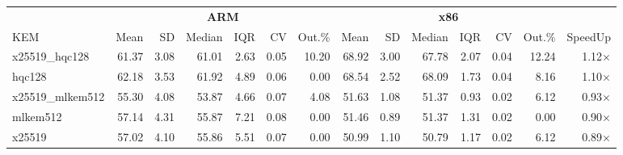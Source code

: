 \begin{table}[!ht]
\centering
\begin{tabular}{l|rrrrrr|rrrrrr|r}
\toprule
& \multicolumn{6}{c}{\bfseries ARM} & \multicolumn{6}{c}{\bfseries x86} & \\
\cmidrule(lr){2-7} \cmidrule(lr){8-13}
KEM & Mean & SD & Median & IQR & CV & Out.\% & Mean & SD & Median & IQR & CV & Out.\% & SpeedUp \\
\midrule
x25519_hqc128 & 61.37 & 3.08 & 61.01 & 2.63 & 0.05 & 10.20 & 68.92 & 3.00 & 67.78 & 2.07 & 0.04 & 12.24 & 1.12× \\
hqc128 & 62.18 & 3.53 & 61.92 & 4.89 & 0.06 & 0.00 & 68.54 & 2.52 & 68.09 & 1.73 & 0.04 & 8.16 & 1.10× \\
x25519_mlkem512 & 55.30 & 4.08 & 53.87 & 4.66 & 0.07 & 4.08 & 51.63 & 1.08 & 51.37 & 0.93 & 0.02 & 6.12 & 0.93× \\
mlkem512 & 57.14 & 4.31 & 55.87 & 7.21 & 0.08 & 0.00 & 51.46 & 0.89 & 51.37 & 1.31 & 0.02 & 0.00 & 0.90× \\
x25519 & 57.02 & 4.10 & 55.86 & 5.51 & 0.07 & 0.00 & 50.99 & 1.10 & 50.79 & 1.17 & 0.02 & 6.12 & 0.89× \\
\bottomrule
\end{tabular}
\end{table}
